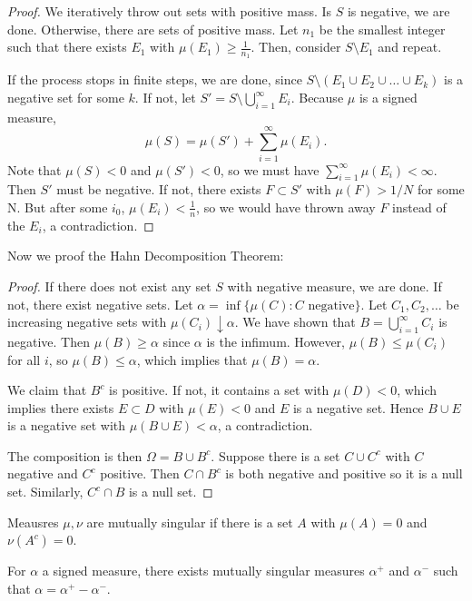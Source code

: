 \documentclass[11pt]{scrartcl}
\begin{document}
\begin{proof}
We iteratively throw out sets with positive mass.  Is $S$ is negative, we are done.  Otherwise, there are sets of positive mass.  Let $n_1$ be the smallest integer such that there exists $E_1$ with $\mu(E_1) \ge \frac{1}{n_1}$.  Then, consider $S \setminus E_1$ and repeat.  

If the process stops in finite steps, we are done, since $S \setminus (E_1 \cup E_2 \cup \dots\cup E_k)$ is a negative set for some $k$.  If not, let $S' = S \setminus \bigcup_{i=1}^{\infty} E_i$.  Because $\mu$ is a signed measure,
$$\mu(S) = \mu(S') + \sum_{i=1}^{\infty} \mu(E_i).$$
Note that $\mu(S) < 0$ and $\mu(S') < 0$, so we must have $\sum_{i=1}^{\infty} \mu(E_i) < \infty$.  Then $S'$ must be negative.  If not, there exists $F \subset S'$ with $\mu(F) > 1/N$ for some N.  But after some $i_0$, $\mu(E_i) < \frac{1}{n}$, so we would have thrown away $F$ instead of the $E_i$, a contradiction.
\end{proof}
Now we proof the Hahn Decomposition Theorem:
\begin{proof}
If there does not exist any set $S$ with negative measure, we are done.    If not, there exist negative sets.  Let $\alpha = \inf\{\mu(C) : C \text{ negative}\}.$  Let $C_1, C_2, \dots$ be increasing negative sets with $\mu(C_i) \downarrow \alpha$.  We have shown that $B = \bigcup_{i=1}^{\infty} C_i$ is negative.  Then $\mu(B) \ge \alpha$ since $\alpha$ is the infimum.  However, $\mu(B) \le \mu(C_i)$ for all $i$, so $\mu(B) \le \alpha$, which implies that $\mu(B) = \alpha$.

We claim that $B^c$ is positive.  If not, it contains a set with $\mu(D) < 0$, which implies there exists $E \subset D$ with $\mu(E) < 0$ and $E$ is a negative set.  Hence $B \cup E$ is a negative set with $\mu(B \cup E) < \alpha$, a contradiction.

The composition is then $\Omega = B \cup B^c$.  Suppose there is a set $C \cup C^c$ with $C$ negative and $C^c$ positive.  Then $C \cap B^c$ is both negative and positive so it is a null set.  Similarly, $C^c \cap B$ is a null set.  
\end{proof}
\begin{definition} Meausres $\mu, \nu$ are mutually singular if there is a set $A$ with $\mu(A) = 0$ and $\nu(A^c) = 0$.
\end{definition}
\begin{thm} For $\alpha$ a signed measure, there exists mutually singular measures $\alpha^+$ and $\alpha^-$ such that $\alpha = \alpha^+ - \alpha^-$.
\end{thm}
\end{document}
